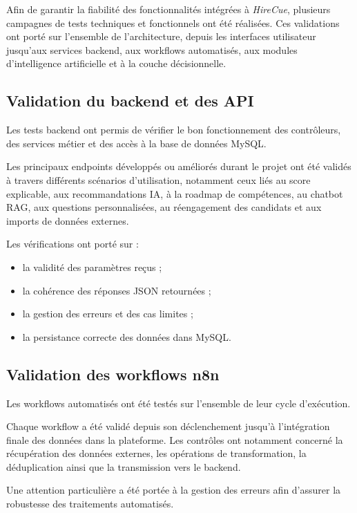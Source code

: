 Afin de garantir la fiabilité des fonctionnalités intégrées à \textit{HireCue}, plusieurs campagnes de tests techniques et fonctionnels ont été réalisées. Ces validations ont porté sur l'ensemble de l'architecture, depuis les interfaces utilisateur jusqu'aux services backend, aux workflows automatisés, aux modules d'intelligence artificielle et à la couche décisionnelle.

\subsection{Validation du backend et des API}

Les tests backend ont permis de vérifier le bon fonctionnement des contrôleurs, des services métier et des accès à la base de données MySQL.

Les principaux endpoints développés ou améliorés durant le projet ont été validés à travers différents scénarios d'utilisation, notamment ceux liés au score explicable, aux recommandations IA, à la roadmap de compétences, au chatbot RAG, aux questions personnalisées, au réengagement des candidats et aux imports de données externes.

Les vérifications ont porté sur :

\begin{itemize}
\item la validité des paramètres reçus ;
\item la cohérence des réponses JSON retournées ;
\item la gestion des erreurs et des cas limites ;
\item la persistance correcte des données dans MySQL.
\end{itemize}

\subsection{Validation des workflows n8n}

Les workflows automatisés ont été testés sur l'ensemble de leur cycle d'exécution.

Chaque workflow a été validé depuis son déclenchement jusqu'à l'intégration finale des données dans la plateforme. Les contrôles ont notamment concerné la récupération des données externes, les opérations de transformation, la déduplication ainsi que la transmission vers le backend.

Une attention particulière a été portée à la gestion des erreurs afin d'assurer la robustesse des traitements automatisés.

